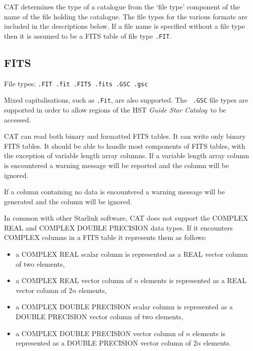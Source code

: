 CAT determines the type of a catalogue from the `file type' component
of the name of the file holding the catalogue. The file types for the
various formats are included in the descriptions below. If a file name
is specified without a file type then it is assumed to be a FITS table
of file type {\tt .FIT}.


\subsection{FITS}

File types: {\tt .FIT  .fit  .FITS  .fits  .GSC  .gsc}

Mixed capitalisations, such as {\tt .Fit}, are also supported.  The {\tt
.GSC} file types are supported in order to allow regions of the HST {\it
Guide Star Catalog}\, to be accessed.

CAT can read both binary and formatted FITS tables. It can write only
binary FITS tables. It should be able to handle most components of
FITS tables, with the exception of variable length array columns. If
a variable length array column is encountered a warning message will
be reported and the column will be ignored. 

If a column containing no data is encountered a warning message will be
generated and the column will be ignored.

In common with other Starlink software, CAT does not support the
COMPLEX REAL and COMPLEX DOUBLE PRECISION data types. If it encounters
COMPLEX columns in a FITS table it represents them as follows:

\begin{itemize}

  \item a COMPLEX REAL scalar column is represented as a REAL vector
   column of two elements,

  \item a COMPLEX REAL vector column of $n$ elements is represented as
   a REAL vector column of $2n$ elements,

  \item a COMPLEX DOUBLE PRECISION scalar column is represented as a 
   DOUBLE PRECISION vector column of two elements,

  \item a COMPLEX DOUBLE PRECISION vector column of $n$ elements is 
   represented as a DOUBLE PRECISION vector column of $2n$ elements.

\end{itemize}

